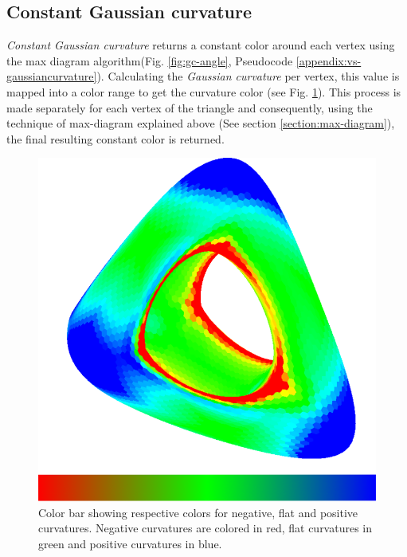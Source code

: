 
\subsection{Constant Gaussian curvature}
\label{section:gc-curvature}
\textit{Constant Gaussian curvature} returns a constant color around each vertex using the max diagram algorithm(Fig. \ref{fig:gc-angle}, Pseudocode \ref{appendix:vs-gaussiancurvature}). Calculating the \textit{Gaussian curvature} per vertex, this value is mapped into a color range to get the curvature color (see Fig. \ref{fig:color-range-curvature}). This process is made separately for each vertex of the triangle and consequently, using the technique of max-diagram explained above (See section \ref{section:max-diagram}), the final resulting constant color is returned.
\begin{figure}[!h]
    \centering
    \includegraphics[scale=1.2]{images/gradient-curvature.png}
    \caption{Color bar showing respective colors for negative, flat and positive curvatures. Negative curvatures are colored in red, flat curvatures in green and positive curvatures in blue.} \label{fig:color-range-curvature}
\end{figure}


